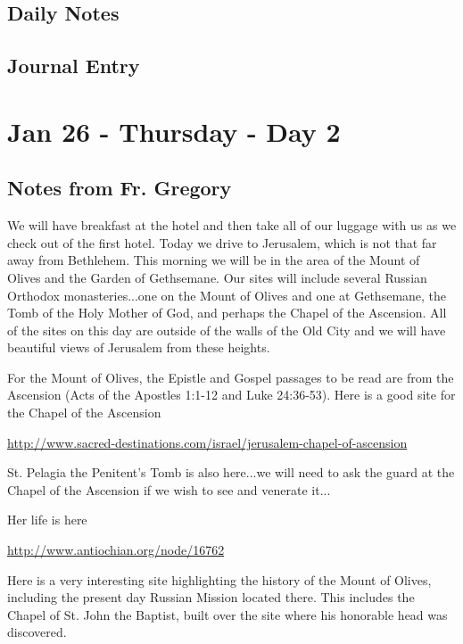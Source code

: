 \documentclass[letterpaper]{report}
\begin{document}
\clearpage
\subsection{Daily Notes}

\clearpage
\subsection{Journal Entry}

\clearpage
\section{Jan 26 - Thursday - Day 2}

\subsection{Notes from Fr. Gregory}
We will have breakfast at the hotel and then take all of our luggage with us as we check out of the first hotel. Today we drive to Jerusalem, which is not that far away from Bethlehem. This morning we will be in the area of the Mount of Olives and the Garden of Gethsemane. Our sites will include several Russian Orthodox monasteries...one on the Mount of Olives and one at Gethsemane, the Tomb of the Holy Mother of God, and perhaps the Chapel of the Ascension. All of the sites on this day are outside of the walls of the Old City and we will have beautiful views of Jerusalem from these heights.

For the Mount of Olives, the Epistle and Gospel passages to be read are from the Ascension (Acts of the Apostles 1:1-12 and Luke 24:36-53). Here is a good site for the Chapel of the Ascension

\url{http://www.sacred-destinations.com/israel/jerusalem-chapel-of-ascension}

St. Pelagia the Penitent's Tomb is also here...we will need to ask the guard at the Chapel of the Ascension if we wish to see and venerate it...

Her life is here

\url{http://www.antiochian.org/node/16762}

Here is a very interesting site highlighting the history of the Mount of Olives, including the present day Russian Mission located there. This includes the Chapel of St. John the Baptist, built over the site where his honorable head was discovered.
\end{document}
